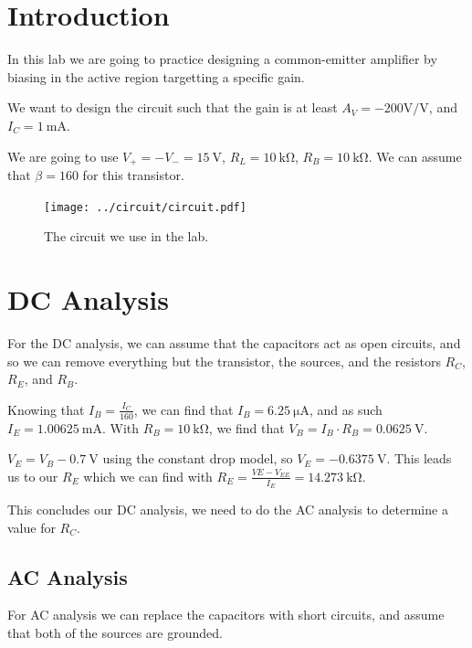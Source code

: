 \documentclass{../../ece-report}
\begin{document}
\maketitle

\section*{Introduction}

In this lab we are going to practice designing a common-emitter
amplifier by biasing in the active region targetting a specific gain.

We want to design the circuit such that the gain is
at least $A_V= -200 \si{\V/\V}$, and $I_C = 1~\si{\mA}$.

We are going to use $V_+ = -V_- = 15~\si{\V}$, $R_L
= 10~\si{\kohm}$, $R_B = 10~\si{\kohm}$. We can assume
that $\beta = 160$ for this transistor.

\begin{figure}[h!]
  \centering
  \texttt{[image: ../circuit/circuit.pdf]}
  \caption{The circuit we use in the lab.}
  \label{fig:circuit}
\end{figure}

\section*{DC Analysis}

For the DC analysis, we can assume that the capacitors act as open
circuits, and so we can remove everything but the transistor,
the sources, and the resistors $R_C$, $R_E$, and $R_B$.

Knowing that $I_B = \frac{I_C}{160}$, we can find that
$I_B = 6.25~\si{\uA}$, and as such $I_E = 1.00625~\si{\mA}$.
With $R_B = 10~\si{\kohm}$, we find that $V_B = I_B
\cdot R_B = 0.0625~\si{\V}$.

$V_E = V_B - 0.7~\si{\V}$ using the constant drop model,
so $V_E = -0.6375~\si{\V}$. This leads us to our $R_E$ which
we can find with $R_E = \frac{VE - V_{EE}}{I_E} = 14.273~\si{\kohm}$.

This concludes our DC analysis, we need to do the AC analysis to determine a value
for $R_C$.

\subsection*{AC Analysis}

For AC analysis we can replace the capacitors with short
circuits, and assume that both of the sources are grounded.
\end{document}
